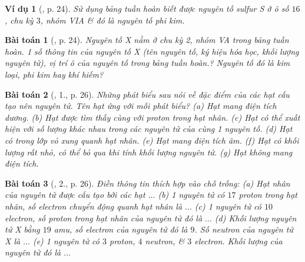 \documentclass{article}
\newtheorem{baitoan}{Bài toán}
\newtheorem{vidu}{Ví dụ}
\begin{document}
\begin{vidu}[\cite{SGK_KHTN_7_Canh_Dieu}, p. 24]
	Sử dụng bảng tuần hoàn biết được nguyên tố sulfur \emph{S} ở ô số $16$, chu kỳ $3$, nhóm VIA \& đó là nguyên tố phi kim.
\end{vidu}

\begin{baitoan}[\cite{SGK_KHTN_7_Canh_Dieu}, p. 24]
	Nguyên tố X nằm ở chu kỳ 2, nhóm VA trong bảng tuần hoàn. 1 số thông tin của nguyên tố X (tên nguyên tố, ký hiệu hóa học, khối lượng nguyên tử), vị trí ô của nguyên tố trong bảng tuần hoàn.? Nguyên tố đó là kim loại, phi kim hay khí hiếm?
\end{baitoan}

\noindent{}

\begin{baitoan}[\cite{SGK_KHTN_7_Canh_Dieu}, 1., p. 26]
	Những phát biểu sau nói về đặc điểm của các hạt cấu tạo nên nguyên tử. Tên hạt ứng với mỗi phát biểu? (a) Hạt mang điện tích dương. (b) Hạt được tìm thấy cùng với proton trong hạt nhân. (c) Hạt có thể xuất hiện với số lượng khác nhau trong các nguyên tử của cùng 1 nguyên tố. (d) Hạt có trong lớp vỏ xung quanh hạt nhân. (e) Hạt mang điện tích âm. (f) Hạt có khối lượng rất nhỏ, có thể bỏ qua khi tính khối lượng nguyên tử. (g) Hạt không mang điện tích.
\end{baitoan}

\begin{baitoan}[\cite{SGK_KHTN_7_Canh_Dieu}, 2., p. 26]
	Điền thông tin thích hợp vào chỗ trống: (a) Hạt nhân của nguyên tử được cấu tạo bởi các hạt $\ldots$ (b) 1 nguyên tử có $17$ proton trong hạt nhân, số electron chuyển động quanh hạt nhân là $\ldots$ (c) 1 nguyên tử có $10$ electron, số proton trong hạt nhân của nguyên tử đó là $\ldots$ (d) Khối lượng nguyên tử X bằng $19$ amu, số electron của nguyên tử đó là $9$. Số neutron của nguyên tử X là $\ldots$ (e) 1 nguyên tử có $3$ proton, $4$ neutron, \& $3$ electron. Khối lượng của nguyên tử đó là $\ldots$
\end{baitoan}
\end{document}
